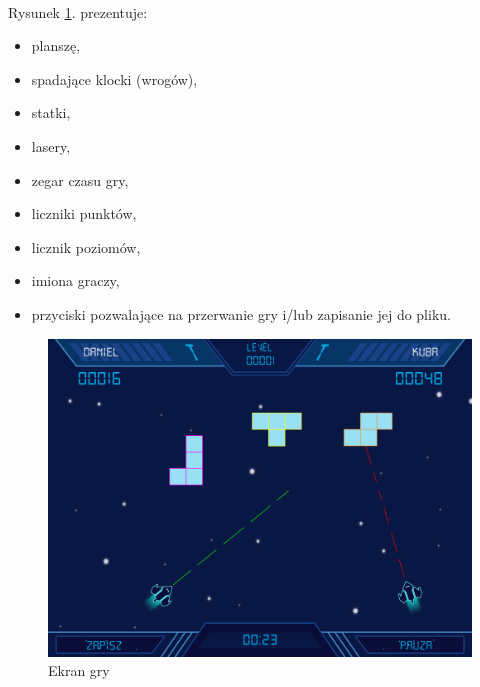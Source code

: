 \documentclass[a4paper]{article}
\begin{document}
\paragraph{}Rysunek \ref{fig:gra}. prezentuje:
\begin{itemize}
    \item planszę,
    \item spadające klocki (wrogów),
    \item statki,
    \item lasery,
    \item zegar czasu gry,
    \item liczniki punktów,
    \item licznik poziomów,
    \item imiona graczy,
    \item przyciski pozwalające na przerwanie gry i/lub zapisanie jej do pliku.
\end{itemize}
\begin{figure}[H]
    \centering
    \includegraphics[width=1\textwidth]{img/ekran-gry.png}
    \caption{Ekran gry}
    \label{fig:gra}
\end{figure}

\newpage
\end{document}
